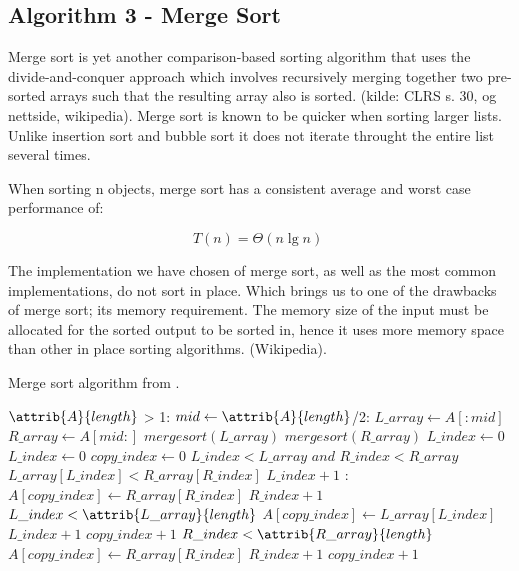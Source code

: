 \documentclass[sigconf, nonacm, natbib, screen, balance=False]{acmart}
\begin{document}
\subsection{Algorithm 3 - Merge Sort}\label{sec:algo2}

Merge sort is yet another comparison-based sorting algorithm that uses the divide-and-conquer approach which involves recursively merging together two pre-sorted arrays such that the resulting array also is sorted. (kilde: CLRS s. 30, og nettside, wikipedia). Merge sort is known to be quicker when sorting larger lists. Unlike insertion sort and bubble sort it does not iterate throught the entire list several times. 

When sorting n objects, merge sort has a consistent average and worst case performance of: 

\begin{equation}
  T(n) = \Theta(n\lg n) \;  \label{eq:merge_sort_best}
\end{equation}

The implementation we have chosen of merge sort, as well as the most common implementations, do not sort in place. Which brings us to one of the drawbacks of merge sort; its memory requirement. The memory size of the input must be allocated for the sorted output to be sorted in, hence it uses more memory space than other in place sorting algorithms. (Wikipedia). 

\begin{listing}
  \caption{Merge sort algorithm from \citet[Ch.~2.1]{CLRS_2009}.}
  \label{lst:merge_algo}

  \begin{codebox}
    \li \If $\attrib{A}{length}$ > 1: 
    \li \Do
    $mid \gets \attrib{A}{length}$/2: 
    \li $L\_array\gets A[:mid]$
    \li $R\_array\gets A[mid:]$
    \li $mergesort(L\_array)$
    \li $mergesort(R\_array)$
    \li $L\_index\gets 0$
    \li $L\_index\gets 0$
    \li $copy\_index\gets 0$
    \li \While $L\_index < L\_array$ $and$ $R\_index < R\_array$ 
    \li \Do
    \If $L\_array[L\_index] < R\_array[R\_index]$
    \li \Do
    $L\_index + 1$
    \li \Else:
    \li $A[copy\_index] \gets R\_array[R\_index]$
    \li $R\_index + 1$
    \End
    \End
    \li \While $L\_index < \attrib{L\_array}{length}$
    \li \Do
    $A[copy\_index] \gets L\_array[L\_index]$
    \li $L\_index + 1$
    \li $copy\_index + 1$
    \End
    \li \While $R\_index < \attrib{R\_array}{length}$
    \li \Do
    $A[copy\_index] \gets R\_array[R\_index]$
    \li $R\_index + 1$
    \li $copy\_index + 1$    
    \End
  \end{codebox}
\end{listing}
\end{document}
